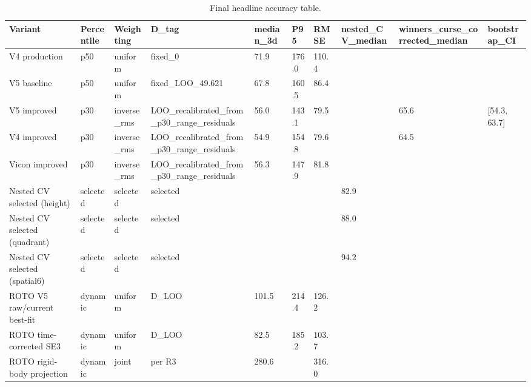 \begin{table}[t]
\centering
\caption{Final headline accuracy table.}
\label{tab:final_headline}
\begin{tabular}{llllllllll}
\hline
Variant & Percentile & Weighting & D\_tag & median\_3d & P95 & RMSE & nested\_CV\_median & winners\_curse\_corrected\_median & bootstrap\_CI \\
\hline
V4 production & p50 & uniform & fixed\_0 & 71.9 & 176.0 & 110.4 &  &  &  \\
V5 baseline & p50 & uniform & fixed\_LOO\_49.621 & 67.8 & 160.5 & 86.4 &  &  &  \\
V5 improved & p30 & inverse\_rms & LOO\_recalibrated\_from\_p30\_range\_residuals & 56.0 & 143.1 & 79.5 &  & 65.6 & [54.3, 63.7] \\
V4 improved & p30 & inverse\_rms & LOO\_recalibrated\_from\_p30\_range\_residuals & 54.9 & 154.8 & 79.6 &  & 64.5 &  \\
Vicon improved & p30 & inverse\_rms & LOO\_recalibrated\_from\_p30\_range\_residuals & 56.3 & 147.9 & 81.8 &  &  &  \\
Nested CV selected (height) & selected & selected & selected &  &  &  & 82.9 &  &  \\
Nested CV selected (quadrant) & selected & selected & selected &  &  &  & 88.0 &  &  \\
Nested CV selected (spatial6) & selected & selected & selected &  &  &  & 94.2 &  &  \\
ROTO V5 raw/current best-fit & dynamic & uniform & D\_LOO & 101.5 & 214.4 & 126.2 &  &  &  \\
ROTO time-corrected SE3 & dynamic & uniform & D\_LOO & 82.5 & 185.2 & 103.7 &  &  &  \\
ROTO rigid-body projection & dynamic & joint & per R3 & 280.6 &  & 316.0 &  &  &  \\
\hline
\end{tabular}
\end{table}
